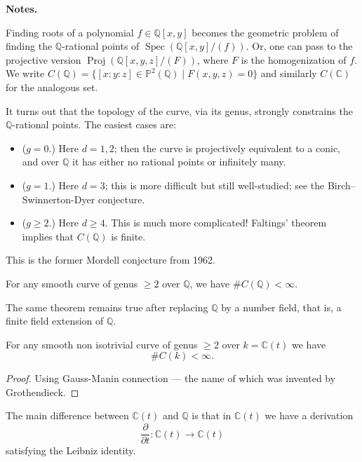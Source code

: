 \medskip\noindent
{\bf Notes.}

Finding roots of a polynomial $f \in
\mathbb{Q}[x,y]$ becomes the geometric
problem of finding the $\mathbb{Q}$-rational
points of $\operatorname{Spec}(\mathbb{Q}[x,y]/(f))$.
Or, one can pass to the projective version
$\operatorname{Proj}(\mathbb{Q}[x,y,z]/(F))$,
where $F$ is the homogenization of $f$.
We write
$C(\mathbb{Q})=\{[x:y:z] \in
\mathbb{P}^2(\mathbb{Q}) \mid
F(x,y,z)=0\}$
and similarly $C(\mathbb{C})$ for the
analogous set.
 
It turns out that the topology
of the curve, via its genus, strongly
constrains the $\mathbb{Q}$-rational points.
The easiest cases are:
\begin{itemize}
\item ($g=0$.) Here $d=1,2$;
then the curve is projectively equivalent to
a conic, and over $\mathbb{Q}$ it has either
no rational points or infinitely many.

\item ($g=1$.) Here $d=3$; this is more difficult
but still well-studied; see the
Birch--Swinnerton-Dyer conjecture. 

\item ($g\geq 2$.) Here $d\geq 4$.
This is much more complicated!
Faltings'
theorem implies that $C(\mathbb{Q})$ is
finite.
\end{itemize}

\noindent
This is the former Mordell conjecture
from 1962.

\begin{theorem}[Faltings, 1983]
For any smooth curve of genus $\geq 2$ over
$\mathbb{Q}$, we have $\#C(\mathbb{Q})<
\infty$.
\end{theorem}

The same theorem remains true after
replacing $\mathbb{Q}$ by a number field,
that is, a finite field extension of
$\mathbb{Q}$.

\begin{theorem}
\label{theorem-manin-grauer}
For any smooth non isotrivial curve of
genus $\geq 2$ over $k=\mathbb{C}(t)$
we have
$$
\# C(k) < \infty.
$$
\end{theorem}

\begin{proof}
Using Gauss-Manin connection ---
the name of which was invented by 
Grothendieck.
\end{proof}

\noindent
The main difference between
$\mathbb{C}(t)$
and $\mathbb{Q}$
is that in $\mathbb{C}(t)$
we have a derivation
$$
\frac{\partial }{\partial t}:
\mathbb{C}(t) \to \mathbb{C}(t)
$$
satisfying the Leibniz identity.

